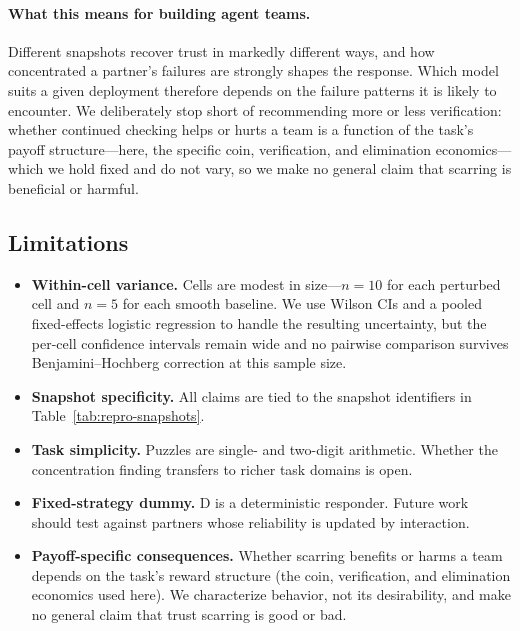 \documentclass{article}
\begin{document}
\paragraph{What this means for building agent teams.} Different snapshots recover trust in markedly different ways, and how concentrated a partner's failures are strongly shapes the response. Which model suits a given deployment therefore depends on the failure patterns it is likely to encounter. We deliberately stop short of recommending more or less verification: whether continued checking helps or hurts a team is a function of the task's payoff structure---here, the specific coin, verification, and elimination economics---which we hold fixed and do not vary, so we make no general claim that scarring is beneficial or harmful.

\subsection{Limitations}
\label{sec:limits}

\begin{itemize}[leftmargin=*, itemsep=1pt, topsep=2pt]
  \item \textbf{Within-cell variance.} Cells are modest in size---$n=10$ for each perturbed cell and $n=5$ for each smooth baseline. We use Wilson CIs and a pooled fixed-effects logistic regression to handle the resulting uncertainty, but the per-cell confidence intervals remain wide and no pairwise comparison survives Benjamini--Hochberg correction at this sample size.
  \item \textbf{Snapshot specificity.} All claims are tied to the snapshot identifiers in Table~\ref{tab:repro-snapshots}.
  \item \textbf{Task simplicity.} Puzzles are single- and two-digit arithmetic. Whether the concentration finding transfers to richer task domains is open.
  \item \textbf{Fixed-strategy dummy.} D is a deterministic responder. Future work should test against partners whose reliability is updated by interaction.
  \item \textbf{Payoff-specific consequences.} Whether scarring benefits or harms a team depends on the task's reward structure (the coin, verification, and elimination economics used here). We characterize behavior, not its desirability, and make no general claim that trust scarring is good or bad.
\end{itemize}

\end{document}
